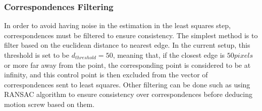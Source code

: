 \documentclass{article}
\begin{document}
\subsubsection{Correspondences Filtering}
In order to avoid having noise in the estimation in the least squares step, correspondences must be filtered to ensure consistency. The simplest method is to filter based on the euclidean distance to nearest edge. In the current setup, this threshold is set to be $d_{threshold} =50$, meaning that, if the closest edge is $50pixels$ or more far away from the point, the corresponding point is considered to be at infinity, and this control point is then excluded from the vector of correspondences sent to least squares. Other filtering can be done such as using RANSAC\cite{fischler1981random} algorithm to ensure consistency over correspondences before deducing motion screw based on them.
\end{document}
